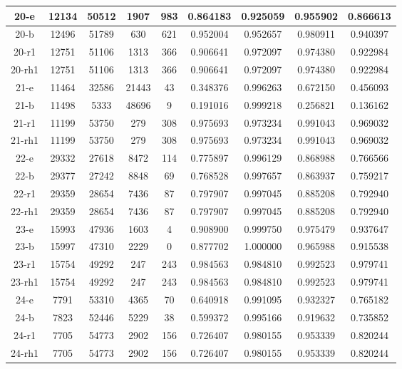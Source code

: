 \begin{longtable}[!h]{|c|c|c|c|c|c|c|c|c|}
	\hline \rowcolor{bad}	20-e	&	12134	&	50512	&	1907	&	983	&	0.864183	&	0.925059	&	0.955902	&	0.866613	\\
	\hline \rowcolor{closest}	20-b	&	12496	&	51789	&	630	&	621	&	0.952004	&	0.952657	&	0.980911	&	0.940397	\\
	\hline	20-r1	&	12751	&	51106	&	1313	&	366	&	0.906641	&	0.972097	&	0.974380	&	0.922984	\\
	\hline	20-rh1	&	12751	&	51106	&	1313	&	366	&	0.906641	&	0.972097	&	0.974380	&	0.922984	\\
	
	\hline	21-e	&	11464	&	32586	&	21443	&	43	&	0.348376	&	0.996263	&	0.672150	&	0.456093	\\
	\hline \rowcolor{bad}	21-b	&	11498	&	5333	&	48696	&	9	&	0.191016	&	0.999218	&	0.256821	&	0.136162	\\
	\hline \rowcolor{closest}	21-r1	&	11199	&	53750	&	279	&	308	&	0.975693	&	0.973234	&	0.991043	&	0.969032	\\
	\hline \rowcolor{closest}	21-rh1	&	11199	&	53750	&	279	&	308	&	0.975693	&	0.973234	&	0.991043	&	0.969032	\\
	
	\hline	22-e	&	29332	&	27618	&	8472	&	114	&	0.775897	&	0.996129	&	0.868988	&	0.766566	\\
	\hline \rowcolor{bad}	22-b	&	29377	&	27242	&	8848	&	69	&	0.768528	&	0.997657	&	0.863937	&	0.759217	\\
	\hline \rowcolor{closest}	22-r1	&	29359	&	28654	&	7436	&	87	&	0.797907	&	0.997045	&	0.885208	&	0.792940	\\
	\hline \rowcolor{closest}	22-rh1	&	29359	&	28654	&	7436	&	87	&	0.797907	&	0.997045	&	0.885208	&	0.792940	\\
	
	\hline	23-e	&	15993	&	47936	&	1603	&	4	&	0.908900	&	0.999750	&	0.975479	&	0.937647	\\
	\hline \rowcolor{bad}	23-b	&	15997	&	47310	&	2229	&	0	&	0.877702	&	1.000000	&	0.965988	&	0.915538	\\
	\hline \rowcolor{closest}	23-r1	&	15754	&	49292	&	247	&	243	&	0.984563	&	0.984810	&	0.992523	&	0.979741	\\
	\hline \rowcolor{closest}	23-rh1	&	15754	&	49292	&	247	&	243	&	0.984563	&	0.984810	&	0.992523	&	0.979741	\\
	
	\hline	24-e	&	7791	&	53310	&	4365	&	70	&	0.640918	&	0.991095	&	0.932327	&	0.765182	\\
	\hline \rowcolor{bad}	24-b	&	7823	&	52446	&	5229	&	38	&	0.599372	&	0.995166	&	0.919632	&	0.735852	\\
	\hline \rowcolor{closest}	24-r1	&	7705	&	54773	&	2902	&	156	&	0.726407	&	0.980155	&	0.953339	&	0.820244	\\
	\hline \rowcolor{closest}	24-rh1	&	7705	&	54773	&	2902	&	156	&	0.726407	&	0.980155	&	0.953339	&	0.820244	\\
	

\end{longtable}
